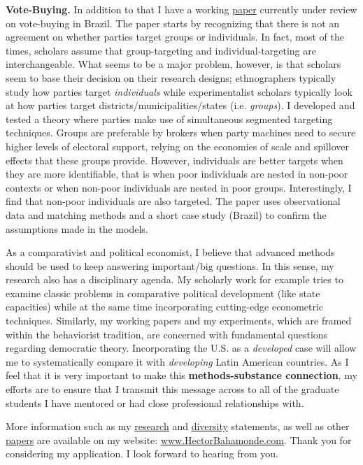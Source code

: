 \documentclass[10pt,stdletter,dateno,sigleft]{newlfm} %
\begin{document}
\begin{newlfm}
{\bf Vote-Buying.} In addition to that I have a working \href{https://github.com/hbahamonde/Clientelism_paper/raw/master/Bahamonde_Clientelism_Paper.pdf}{paper} currently under review on vote-buying in Brazil. The paper starts by recognizing that there is not an agreement on whether parties target groups or individuals. In fact, most of the times, scholars assume that group-targeting and individual-targeting are interchangeable. What seems to be a major problem, however, is that scholars seem to base their decision on their research designs; ethnographers typically study how parties target \emph{individuals} while experimentalist scholars typically look at how parties target districts/municipalities/states (i.e. \emph{groups}). I developed and tested a theory where parties make use of simultaneous segmented targeting techniques. Groups are preferable by brokers when party machines need to secure higher levels of electoral support, relying on the economies of scale and spillover effects that these groups provide. However, individuals are better targets when they are more identifiable, that is when poor individuals are nested in non-poor contexts or when non-poor individuals are nested in poor groups. Interestingly, I find that non-poor individuals are also targeted. The paper uses observational data and matching methods and a short case study (Brazil) to confirm the assumptions made in the models.

As a comparativist and political economist, I believe that advanced methods should be used to keep answering important/big questions. In this sense, my research also has a disciplinary agenda. My scholarly work for example tries to examine classic problems in comparative political development (like state capacities) while at the same time incorporating cutting-edge econometric techniques. Similarly, my working papers and my experiments, which are framed within the behaviorist tradition, are concerned with fundamental questions regarding democratic theory. Incorporating the U.S. as a \emph{developed} case will allow me to systematically compare it with \emph{developing} Latin American countries. As I feel that it is very important to make this {\bf methods-substance connection}, my efforts are to ensure that I transmit this message across to all of the graduate students I have mentored or had close professional relationships with. 


More information such as my \href{http://github.com/hbahamonde/Job_Market/raw/master/Bahamonde_Research_Statement.pdf}{research} and \href{http://github.com/hbahamonde/Job_Market/raw/master/Bahamonde_Diversity_Statement.pdf}{diversity} statements, as well as other \href{http://www.hectorbahamonde.com/research/}{papers} are available on my website: \href{http://www.hectorbahamonde.com}{www.HectorBahamonde.com}. Thank you for considering my application. I look forward to hearing from you.






\end{newlfm}
\end{document}
